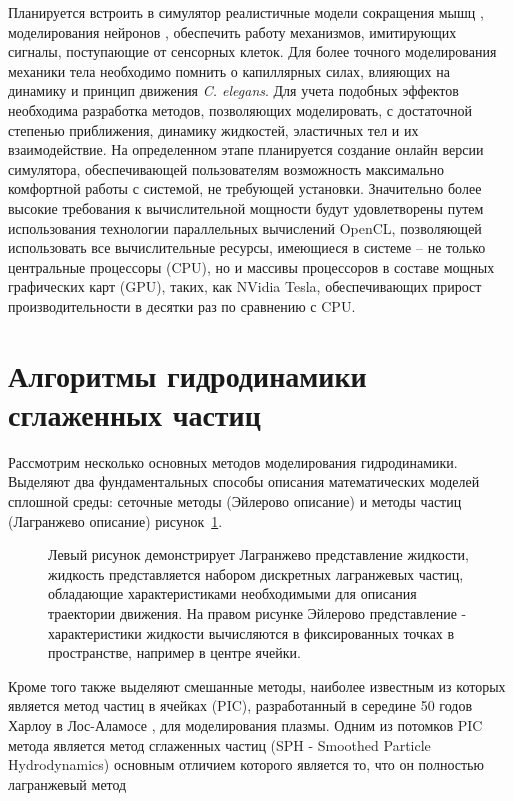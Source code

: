 Планируется встроить в симулятор реалистичные модели сокращения мышц \cite {Huxley1957MuscleSA}, моделирования нейронов \cite {Gleeson2010}, обеспечить работу механизмов, имитирующих сигналы, поступающие от сенсорных клеток. Для более точного моделирования механики тела необходимо помнить о капиллярных силах, влияющих на динамику и принцип движения \textit{C. elegans}. Для учета подобных эффектов необходима разработка методов, позволяющих моделировать, с достаточной степенью приближения, динамику жидкостей, эластичных тел и их взаимодействие. На определенном этапе планируется создание онлайн версии симулятора, обеспечивающей пользователям возможность максимально комфортной работы с системой, не требующей установки. Значительно более высокие требования к вычислительной мощности будут удовлетворены путем использования технологии параллельных вычислений OpenCL, позволяющей использовать все вычислительные ресурсы, имеющиеся в системе – не только центральные процессоры (CPU), но и массивы процессоров в составе мощных графических карт (GPU), таких, как NVidia Tesla, обеспечивающих прирост производительности в десятки раз по сравнению с CPU.

\section{Алгоритмы гидродинамики сглаженных частиц}\label{sec:ch1/sec3}

Рассмотрим несколько основных методов моделирования гидродинамики. Выделяют два фундаментальных способы описания математических моделей сплошной среды: сеточные методы (Эйлерово описание) и методы частиц  (Лагранжево описание) рисунок~\ref{fig:sim_class}.

\begin{figure}[ht]
    \caption{Левый рисунок демонстрирует Лагранжево представление жидкости, жидкость представляется набором дискретных лагранжевых частиц, обладающие характеристиками необходимыми для описания траектории движения. На правом рисунке Эйлерово представление - характеристики жидкости вычисляются в фиксированных точках в пространстве, например в центре ячейки.}\label{fig:sim_class}
\end{figure}

Кроме того также выделяют смешанные методы, наиболее известным из которых является метод частиц в ячейках (PIC), разработанный в середине 50 годов Харлоу в Лос-Аламосе \cite {Harlow1963, Belocherkovsky1982, Grigoriev2000}, для моделирования плазмы. Одним из потомков PIC метода является метод сглаженных частиц (SPH - Smoothed Particle Hydrodynamics) основным отличием которого является то, что он полностью лагранжевый метод \cite{Gingold1977, Lucy1977}

